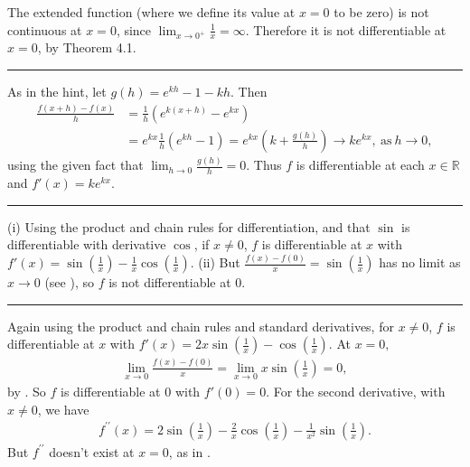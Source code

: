 \documentclass[letterpaper,10pt,english]{jupyterBook}
\begin{document}
The extended function (where we define its value at \(x=0\) to be zero) is not continuous at \(x=0\), since \(\lim_{x \rightarrow 0^+}\frac{1}{x} =\infty\). Therefore it is not differentiable at \(x=0\), by Theorem 4.1.


\bigskip\hrule\bigskip


\sphinxAtStartPar
{\hyperref[\detokenize{Problems:id40}]{}} As in the hint, let \(g(h) = e^{kh} - 1 - kh \). Then
\begin{align*}
\frac{f(x + h) -f(x)}{h} &= \frac{1}{h}(e^{k(x +h)} - e^{kx})\\
&= e^{kx}\frac{1}{h}(e^{kh} - 1) = e^{kx}\left(k + \frac{g(h)}{h}\right) \rightarrow ke^{kx},~\mbox{as}~h \rightarrow 0,
\end{align*}
\sphinxAtStartPar
using the given fact that  \(\lim_{h \rightarrow 0}\frac{g(h)}{h} = 0\). Thus \(f\) is differentiable at each \(x\in\mathbb{R}\) and \(f'(x)=ke^{kx}\).


\bigskip\hrule\bigskip


\sphinxAtStartPar
{\hyperref[\detokenize{Problems:id41}]{}}
(i) Using the product and chain rules for differentiation, and that \(\sin\) is differentiable with derivative \(\cos\),
if \(x \neq 0\), \(f\) is differentiable at \(x\) with \(f'(x) = \sin\left(\frac{1}{x}\right) - \frac{1}{x}\cos\left(\frac{1}{x}\right)\).
(ii) But
\(\frac{f(x) - f(0)}{x} = \sin\left(\frac{1}{x}\right)\) has no limit as \(x \rightarrow 0\) (see {\hyperref[\detokenize{Problems:id9}]{}}), so \(f\) is not differentiable at \(0\).


\bigskip\hrule\bigskip


\sphinxAtStartPar
{\hyperref[\detokenize{Problems:id42}]{}} Again using the product and chain rules and standard derivatives,
for \(x \neq 0\), \(f\) is differentiable at \(x\) with \(f'(x) = 2x\sin\left(\frac{1}{x}\right) - \cos\left(\frac{1}{x}\right)\). At \(x = 0,\)
\begin{equation*}
\begin{split}
\lim_{x \rightarrow 0}\frac{f(x) - f(0)}{x} = \lim_{x \rightarrow 0}x\sin\left(\frac{1}{x}\right) = 0,
\end{split}
\end{equation*}
\sphinxAtStartPar
by {\hyperref[\detokenize{Problems:id10}]{}}. So \(f\) is differentiable at \(0\) with \(f'(0) = 0\). For the second derivative, with \(x \neq 0\), we have
\begin{equation*}
\begin{split}
f^{\prime \prime}(x) = 2\sin\left(\frac{1}{x}\right) - \frac{2}{x}\cos\left(\frac{1}{x}\right) - \frac{1}{x^{2}}\sin\left(\frac{1}{x}\right).
\end{split}
\end{equation*}
\sphinxAtStartPar
But \(f^{\prime \prime}\) doesn’t exist at \(x = 0\), as in {\hyperref[\detokenize{Problems:id41}]{}}.
\end{document}
